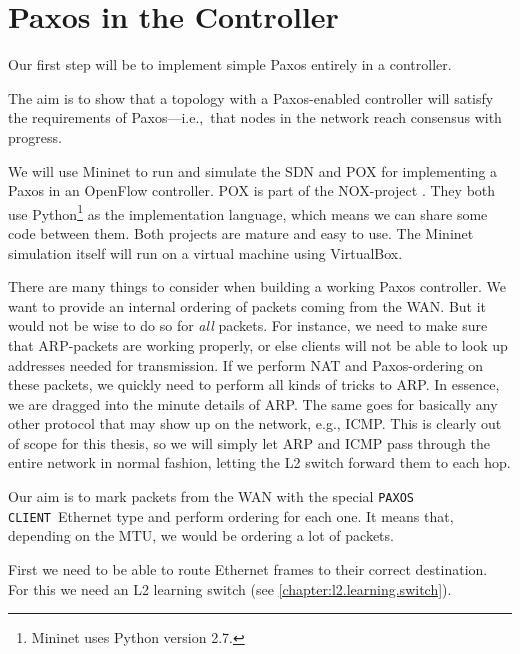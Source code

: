 \section{Paxos in the Controller}

Our first step will be to implement simple Paxos \cite{Lam01} entirely in a
controller.

The aim is to show that a topology with a Paxos-enabled controller will
satisfy the requirements of Paxos---i.e.,~that nodes in the network reach
consensus with progress.

We will use Mininet \cite{Lantz:2010:NLR:1868447.1868466} to
run and simulate the \ac{SDN} and POX \cite{POX.1} for
implementing a Paxos in an OpenFlow controller.  POX is part of the
NOX-project \cite{Gude:2008:NTO:1384609.1384625}.  They both use
Python\footnote{Mininet uses Python version 2.7.}
\cite{vanRossum:2009:PRM:1610526} as the implementation language, which
means we can share some code between them.  Both projects are mature and
easy to use.  The Mininet simulation itself will run on a virtual machine
using VirtualBox.

There are many things to consider when building a working Paxos controller.
We want to provide an internal ordering of packets coming from the \ac{WAN}.
But it would not be wise to do so for \textit{all} packets. For instance, we
need to make sure that \ac{ARP}-packets are working properly, or else
clients will not be able to look up addresses needed for transmission.
If we perform \ac{NAT} and Paxos-ordering on these packets, we quickly need
to perform all kinds of tricks to \acs{ARP}.  In essence, we are dragged
into the minute details of \acs{ARP}.  The same goes for basically any other
protocol that may show up on the network, e.g., \ac{ICMP}.
%
This is clearly out of scope for this
thesis, so we will simply let \acs{ARP} and \acs{ICMP} pass through the
entire network in normal fashion, letting the \acs{L2} switch forward them
to each hop.

Our aim is to mark packets from the \ac{WAN} with the special
\texttt{PAXOS CLIENT} Ethernet type and perform ordering for each one.
It means that, depending on the \ac{MTU}, we would be ordering a lot of
packets.

First we need to be able to route Ethernet frames to their correct
destination. For this we need an \ac{L2} learning switch (see
    \vref{chapter:l2.learning.switch}).

